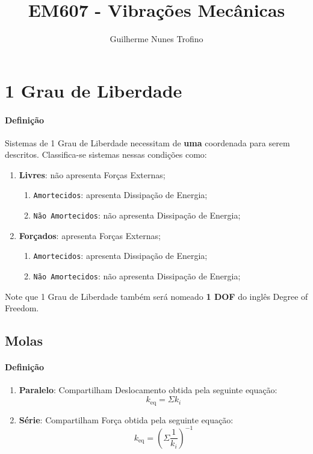 \documentclass{article}
\title{EM607 - Vibrações Mecânicas}
\author{Guilherme Nunes Trofino}
\begin{document}
    \maketitle

\newpage\tableofcontents

\newpage\section{1 Grau de Liberdade}
    \paragraph{Definição}Sistemas de 1 Grau de Liberdade necessitam de \textbf{uma} coordenada para serem descritos. Classifica-se sistemas nessas condições como:
    \begin{enumerate}[rightmargin = \leftmargin]
        \item \textbf{Livres}: não apresenta Forças Externas;
        \begin{enumerate}[noitemsep]
            \item \texttt{Amortecidos}: apresenta Dissipação de Energia;
            \item \texttt{Não Amortecidos}: não apresenta Dissipação de Energia;
        \end{enumerate}

        \item \textbf{Forçados}: apresenta Forças Externas;
        \begin{enumerate}[noitemsep]
            \item \texttt{Amortecidos}: apresenta Dissipação de Energia;
            \item \texttt{Não Amortecidos}: não apresenta Dissipação de Energia;
        \end{enumerate}

    \end{enumerate}\noindent
    Note que 1 Grau de Liberdade também será nomeado \textbf{1 DOF} do inglês Degree of Freedom. \cite{620.3R18v}

\subsection{Molas}
    \paragraph{Definição}
    \begin{enumerate}[rightmargin = \leftmargin]
        \item \textbf{Paralelo}: Compartilham Deslocamento obtida pela seguinte equação:
        \begin{equation}
            k_{\text{eq}} = \Sigma k_i
        \end{equation}

        \item \textbf{Série}: Compartilham Força obtida pela seguinte equação:
        \begin{equation}
            k_{\text{eq}} = \left( \Sigma \frac{1}{k_{i}} \right)^{-1}
        \end{equation}
    \end{enumerate}
\end{document}

